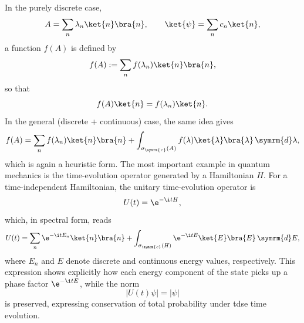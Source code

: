 In the purely discrete case,
\begin{equation}
A=\sum_n\lambda_n\ket{n}\bra{n},\qquad\ket{\psi}=\sum_n c_n\ket{n},
\end{equation}
a function $f(A)$ is defined by
\begin{equation}
f(A):=\sum_n f(\lambda_n)\ket{n}\bra{n},
\end{equation}
so that
\begin{equation}
f(A)\ket{n}=f(\lambda_n)\ket{n}.
\end{equation}
In the general (discrete + continuous) case, the same idea gives
\begin{equation}
f(A)=\sum_n f(\lambda_n)\ket{n}\bra{n}+\int_{\sigma_{\symrm{c}}(A)}f(\lambda)\ket{\lambda}\bra{\lambda}\,\symrm{d}\lambda,
\end{equation}
which is again a heuristic form. The most important example in quantum mechanics is the time-evolution operator generated by a Hamiltonian $H$. For a time-independent Hamiltonian, the unitary time-evolution operator is
\begin{equation}
U(t)=\e^{-\i tH},
\end{equation}
which, in spectral form, reads
\begin{equation}
U(t)=\sum_n\e^{-\i tE_n} \ket{n}\bra{n}+\int_{\sigma_{\symrm{c}}(H)}\e^{-\i tE}\ket{E}\bra{E}\,\symrm{d}E,
\end{equation}
where $E_n$ and $E$ denote discrete and continuous energy values, respectively. This expression shows explicitly how each energy component of the state picks up a phase factor $\e^{-\i tE}$, while the norm
\begin{equation}
\lvert U(t)\psi\rvert=\lvert\psi\rvert
\end{equation}
is preserved, expressing conservation of total probability under \acrfull{tdse} time evolution.
